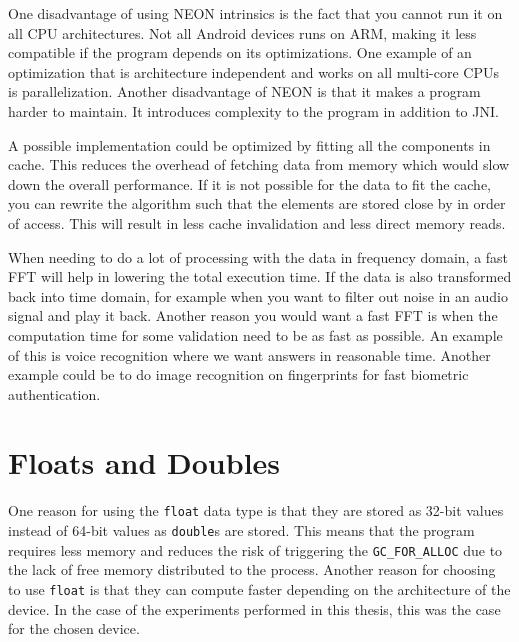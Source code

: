 
One disadvantage of using NEON intrinsics is the fact that you cannot run it on all CPU architectures. Not all Android devices runs on ARM, making it less compatible if the program depends on its optimizations. One example of an optimization that is architecture independent and works on all multi-core CPUs is parallelization. Another disadvantage of NEON is that it makes a program harder to maintain. It introduces complexity to the program in addition to JNI. 

A possible implementation could be optimized by fitting all the components in cache. This reduces the overhead of fetching data from memory which would slow down the overall performance. If it is not possible for the data to fit the cache, you can rewrite the algorithm such that the elements are stored close by in order of access. This will result in less cache invalidation and less direct memory reads.

When needing to do a lot of processing with the data in frequency domain, a fast FFT will help in lowering the total execution time. If the data is also transformed back into time domain, for example when you want to filter out noise in an audio signal and play it back. Another reason you would want a fast FFT is when the computation time for some validation need to be as fast as possible. An example of this is voice recognition where we want answers in reasonable time. Another example could be to do image recognition on fingerprints for fast biometric authentication.



\section{Floats and Doubles}

One reason for using the \texttt{float} data type is that they are stored as 32-bit values instead of 64-bit values as \texttt{double}s are stored. This means that the program requires less memory and reduces the risk of triggering the \texttt{GC\_FOR\_ALLOC} due to the lack of free memory distributed to the process. Another reason for choosing to use \texttt{float} is that they can compute faster depending on the architecture of the device. In the case of the experiments performed in this thesis, this was the case for the chosen device.

